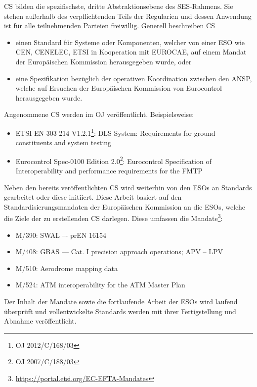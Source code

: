 
    \acf{CS} bilden die spezifischste, dritte Abstraktionsebene des \ac{SES}-Rahmens.
    Sie stehen außerhalb des verpflichtenden Teils der Regularien und dessen Anwendung ist für alle teilnehmenden Parteien freiwillig. 
    Generell beschreiben \ac{CS}
    
    \begin{itemize}
        \item einen Standard für Systeme oder Komponenten, welcher von einer \ac{ESO} wie \ac{CEN}, \ac{CENELEC}, \ac{ETSI} in Kooperation mit \ac{EUROCAE}, auf einem Mandat der Europäischen Kommission herausgegeben wurde, oder
        \item eine Spezifikation bezüglich der operativen Koordination zwischen den \ac{ANSP}, welche auf Ersuchen der Europäischen Kommission von Eurocontrol herausgegeben wurde.
    \end{itemize}

    \noindent
    Angenommene \ac{CS} werden im \acf{OJ} veröffentlicht.
    Beispielsweise:

    \begin{itemize}
        \item \ac{ETSI} EN 303 214 V1.2.1\footnote{\ac{OJ} 2012/C/168/03}: 
            \acf{DLS} System: Requirements for ground constituents and system testing
        \item Eurocontrol Spec-0100 Edition 2.0\footnote{\ac{OJ} 2007/C/188/03}:
            Eurocontrol Specification of Interoperability and performance requirements for the \acf{FMTP}
    \end{itemize}
    
    \noindent
    Neben den bereits veröffentlichten \ac{CS} wird weiterhin von den \acp{ESO} an Standards gearbeitet oder diese initiiert. 
    Diese Arbeit basiert auf den Standardisierungsmandaten der Europäischen Kommission an die \acp{ESO}, welche die Ziele der zu erstellenden \ac{CS} darlegen.
    Diese umfassen die Mandate\footnote{\href{https://portal.etsi.org/EC-EFTA-Mandates}{https://portal.etsi.org/EC-EFTA-Mandates}}:
    \begin{itemize}
        \item M/390: \acf{SWAL} –- prEN 16154
        \item M/408: \acf{GBAS} --- Cat. I precision approach operations; \ac{APV} – \ac{LPV}
        \item M/510: Aerodrome mapping data
        \item M/524: \acf{ATM} interoperability for the ATM Master Plan
    \end{itemize}

    \noindent
    Der Inhalt der Mandate sowie die fortlaufende Arbeit der ESOs wird laufend überprüft und vollentwickelte Standards werden mit ihrer Fertigstellung und Abnahme veröffentlicht.
    